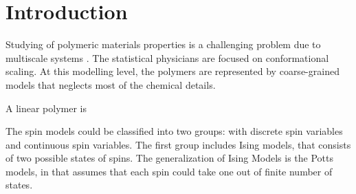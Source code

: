\chapter{Introduction} \label{ch:intro}

Studying of polymeric materials properties is a challenging problem due to multiscale systems \cite{doi:10.1021/acspolymersau.2c00049}.
The statistical physicians are focused on conformational scaling.
At this modelling level, the polymers are represented by coarse-grained models that neglects most of the chemical details.

A linear polymer is

The spin models could be classified into two groups: with discrete spin variables and continuous spin variables.
The first group includes Ising models, that consists of two possible states of spins.
The generalization of Ising Models is the Potts models, in that assumes that each spin could take one out of finite number of states.





